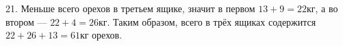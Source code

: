 21. Меньше всего орехов в третьем ящике, значит в первом $13+9=22$кг, а во втором --- $22+4=26$кг. Таким образом, всего в трёх ящиках содержится $22+26+13=61$кг орехов.\\
